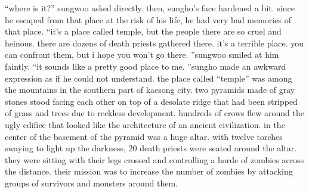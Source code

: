 “where is it?” sungwoo asked directly.
then, sungho’s face hardened a bit.
 since he escaped from that place at the risk of his life, he had very bad memories of that place.
“it’s a place called temple, but the people there are so cruel and heinous.
 there are dozens of death priests gathered there.
 it’s a terrible place.
 you can confront them, but i hope you won’t go there.
”sungwoo smiled at him faintly.
“it sounds like a pretty good place to me.
”sungho made an awkward expression as if he could not understand.
the place called “temple” was among the mountains in the southern part of kaesong city.
two pyramids made of gray stones stood facing each other on top of a desolate ridge that had been stripped of grass and trees due to reckless development.
 hundreds of crows flew around the ugly edifice that looked like the architecture of an ancient civilization.
in the center of the basement of the pyramid was a huge altar.
with twelve torches swaying to light up the darkness, 20 death priests were seated around the altar.
they were sitting with their legs crossed and controlling a horde of zombies across the distance.
 their mission was to increase the number of zombies by attacking groups of survivors and monsters around them.

